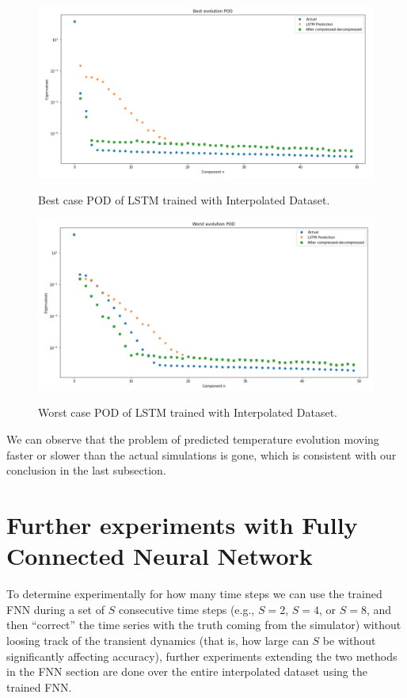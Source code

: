 \begin{figure}[H]
    \caption{Best case POD of LSTM trained with Interpolated Dataset.}
    \includegraphics[scale=0.5]{figures/mantle_convection_images/larger_dataset_interpolated/LSTM_Best_POD.png}
    \label{figure:LSTM_interpolated_best_POD}
\end{figure}

\begin{figure}[H]
    \caption{Worst case POD of LSTM trained with Interpolated Dataset.}
    \includegraphics[scale=0.5]{figures/mantle_convection_images/larger_dataset_interpolated/LSTM_Worst_POD.png}
    \label{figure:LSTM_interpolated_worst_POD}
\end{figure}


We can observe that the problem of predicted temperature evolution moving faster or slower than the actual simulations is gone, which is consistent with our conclusion in the last subsection.

\section{Further experiments with Fully Connected Neural Network}

To determine experimentally for how many time steps we can use the trained FNN during a set of $S$ consecutive time steps (e.g., $S=2$, $S=4$, or $S=8$, and then ``correct'' the time series with the truth coming from the simulator) without loosing track of the transient dynamics (that is, how large can $S$ be without significantly affecting accuracy), further experiments extending the two methods in the FNN section are done over the entire interpolated dataset using the trained FNN.

